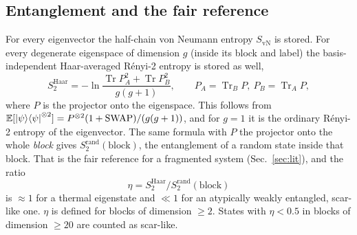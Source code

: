 \subsection{Entanglement and the fair reference}
For every eigenvector the half-chain von Neumann entropy $S_\mathrm{vN}$ is
stored. For every degenerate eigenspace of dimension $g$ (inside its block and
label) the basis-independent Haar-averaged R\'enyi-2 entropy is stored as well,
\begin{equation}
  S_2^\mathrm{Haar}=-\ln\frac{\operatorname{Tr}P_A^2+\operatorname{Tr}P_B^2}{g(g+1)},
  \qquad P_A=\operatorname{Tr}_BP,\ P_B=\operatorname{Tr}_AP,
  \label{eq:s2haar}
\end{equation}
where $P$ is the projector onto the eigenspace. This follows from
$\mathbb{E}[\ket\psi\!\bra\psi^{\otimes2}]=P^{\otimes2}(1+\mathrm{SWAP})/(g(g+1))$,
and for $g=1$ it is the ordinary R\'enyi-2 entropy of the eigenvector. The same
formula with $P$ the projector onto the whole \emph{block} gives
$S_2^\mathrm{rand}(\mathrm{block})$, the entanglement of a random state inside
that block. That is the fair reference for a fragmented system
(Sec.~\ref{sec:lit}), and the ratio
\begin{equation}
  \eta=S_2^\mathrm{Haar}/S_2^\mathrm{rand}(\mathrm{block})
\end{equation}
is $\approx1$ for a thermal eigenstate and $\ll1$ for an atypically weakly
entangled, scar-like one. $\eta$ is defined for blocks of dimension $\ge2$.
States with $\eta<0.5$ in blocks of dimension $\ge20$ are counted as
scar-like.
